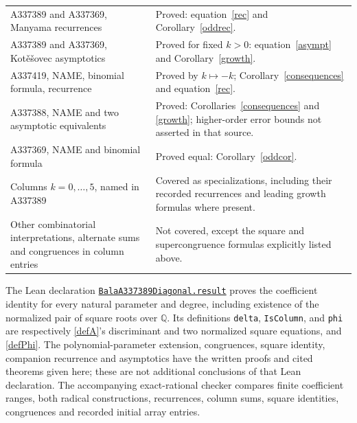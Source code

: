 \documentclass[11pt]{article}
\begin{document}
\begin{longtable}{@{}p{.43\linewidth}p{.53\linewidth}@{}}
A337389 and A337369, Manyama recurrences & Proved: equation~\eqref{rec} and Corollary~\ref{oddrec}.\\
A337389 and A337369, Kot\v e\v sovec asymptotics & Proved for fixed $k>0$: equation~\eqref{asympt} and Corollary~\ref{growth}.\\
A337419, NAME, binomial formula, recurrence & Proved by $k\mapsto-k$; Corollary~\ref{consequences} and equation~\eqref{rec}.\\
A337388, NAME and two asymptotic equivalents & Proved: Corollaries~\ref{consequences} and \ref{growth}; higher-order error bounds not asserted in that source.\\
A337369, NAME and binomial formula & Proved equal: Corollary~\ref{oddcor}.\\
Columns $k=0,\ldots,5$, named in A337389 & Covered as specializations, including their recorded recurrences and leading growth formulas where present.\\
Other combinatorial interpretations, alternate sums and congruences in column entries & Not covered, except the square and supercongruence formulas explicitly listed above.\\
\bottomrule
\end{longtable}
\endgroup

The Lean declaration
\href{https://github.com/the-omega-institute/trureturing/blob/3378450a2176909e857354ab064dde6ec7679b71/D5/S3/Combinatorics/PowerSeries/BalaA337389Diagonal.lean}{\texttt{BalaA337389Diagonal.result}}
proves the coefficient identity for every natural parameter and degree,
including existence of the normalized pair of square roots over
$\mathbb Q$. Its definitions \texttt{delta}, \texttt{IsColumn}, and
\texttt{phi} are respectively \eqref{defA}'s discriminant and two
normalized square equations, and \eqref{defPhi}.
The polynomial-parameter extension, congruences, square identity,
companion recurrence and asymptotics have the written proofs and cited
theorems given here; these are not additional conclusions of that Lean
declaration. The accompanying exact-rational checker compares finite
coefficient ranges, both radical constructions, recurrences, column sums,
square identities, congruences and recorded initial array entries.
\end{document}

